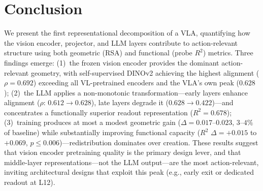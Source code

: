 \section{Conclusion}
\label{sec:conclusion}

We present the first representational decomposition of a VLA, quantifying how the vision encoder, projector, and LLM layers contribute to action-relevant structure using both geometric (RSA) and functional (probe $R^2$) metrics.
Three findings emerge: (1)~the frozen vision encoder provides the dominant action-relevant geometry, with self-supervised DINOv2 achieving the highest alignment ($\rho = 0.692$) exceeding all VL-pretrained encoders and the VLA's own peak ($0.628$); (2)~the LLM applies a non-monotonic transformation---early layers enhance alignment ($\rho$: $0.612 \to 0.628$), late layers degrade it ($0.628 \to 0.422$)---and concentrates a functionally superior readout representation ($R^2 = 0.678$); (3)~training produces at most a modest geometric gain ($\Delta = 0.017$--$0.023$, $3$--$4\%$ of baseline) while substantially improving functional capacity ($R^2$ $\Delta = +0.015$ to $+0.069$, $p \leq 0.006$)---redistribution dominates over creation.
These results suggest that vision encoder pretraining quality is the primary design lever, and that middle-layer representations---not the LLM output---are the most action-relevant, inviting architectural designs that exploit this peak (e.g., early exit or dedicated readout at L12).
